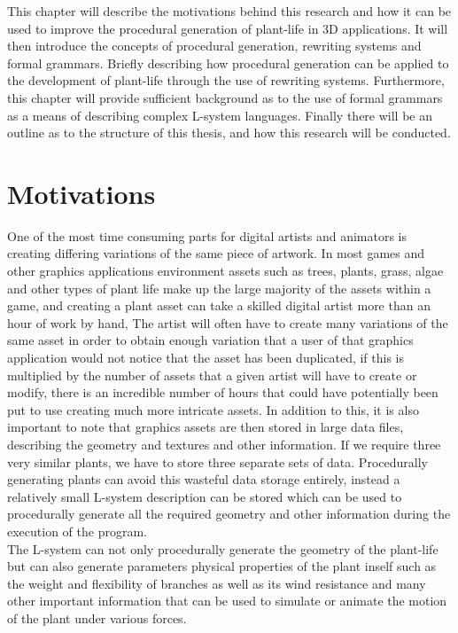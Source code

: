 This chapter will describe the motivations behind this research and how it can be used to improve the procedural generation of plant-life in 3D applications. It will then introduce the concepts of procedural generation, rewriting systems and formal grammars. Briefly describing how procedural generation can be applied to the development of plant-life through the use of rewriting systems. Furthermore, this chapter will provide sufficient background as to the use of formal grammars as a means of describing complex L-system languages. Finally there will be an outline as to the structure of this thesis, and how this research will be conducted.

\section{Motivations}
 
One of the most time consuming parts for digital artists and animators is creating differing variations of the same piece of artwork. In most games and other graphics applications environment assets such as trees, plants, grass, algae and other types of plant life make up the large majority of the assets within a game, and creating a plant asset can take a skilled digital artist more than an hour of work by hand, The artist will often have to create many variations of the same asset in order to obtain enough variation that a user of that graphics application would not notice that the asset has been duplicated, if this is multiplied by the number of assets that a given artist will have to create or modify, there is an incredible number of hours that could have potentially been put to use creating much more intricate assets. In addition to this, it is also important to note that graphics assets are then stored in large data files, describing the geometry and textures and other information. If we require three very similar plants, we have to store three separate sets of data. Procedurally generating plants can avoid this wasteful data storage entirely, instead a relatively small L-system description can be stored which can be used to procedurally generate all the required geometry and other information during the execution of the program.\\

The L-system can not only procedurally generate the geometry of the plant-life but can also generate parameters physical properties of the plant inself such as the weight and flexibility of branches as well as its wind resistance and many other important information that can be used to simulate or animate the motion of the plant under various forces.  

